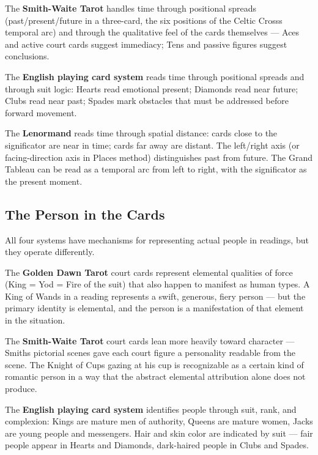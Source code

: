 The \textbf{Smith-Waite Tarot} handles time through positional spreads (past/present/future in a three-card, the six positions of the Celtic Cross\textquotesingle s temporal arc) and through the qualitative feel of the cards themselves --- Aces and active court cards suggest immediacy; Tens and passive figures suggest conclusions.

The \textbf{English playing card system} reads time through positional spreads and through suit logic: Hearts read emotional present; Diamonds read near future; Clubs read near past; Spades mark obstacles that must be addressed before forward movement.

The \textbf{Lenormand} reads time through spatial distance: cards close to the significator are near in time; cards far away are distant. The left/right axis (or facing-direction axis in Place\textquotesingle s method) distinguishes past from future. The Grand Tableau can be read as a temporal arc from left to right, with the significator as the present moment.

\subsection{The Person in the Cards}\label{the-person-in-the-cards}

All four systems have mechanisms for representing actual people in readings, but they operate differently.

The \textbf{Golden Dawn Tarot} court cards represent elemental qualities of force (King = Yod = Fire of the suit) that also happen to manifest as human types. A King of Wands in a reading represents a swift, generous, fiery person --- but the primary identity is elemental, and the person is a manifestation of that element in the situation.

The \textbf{Smith-Waite Tarot} court cards lean more heavily toward character --- Smith\textquotesingle s pictorial scenes gave each court figure a personality readable from the scene. The Knight of Cups gazing at his cup is recognizable as a certain kind of romantic person in a way that the abstract elemental attribution alone does not produce.

The \textbf{English playing card system} identifies people through suit, rank, and complexion: Kings are mature men of authority, Queens are mature women, Jacks are young people and messengers. Hair and skin color are indicated by suit --- fair people appear in Hearts and Diamonds, dark-haired people in Clubs and Spades.

